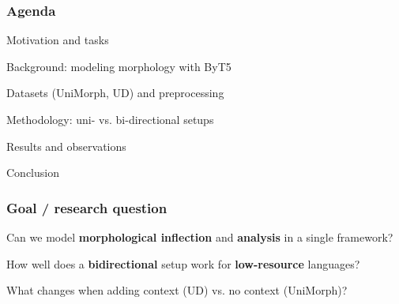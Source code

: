 
\begin{frame}
    \frametitle{Agenda}
    \begin{PraesentationAufzaehlung}
        \item Motivation and tasks
        \item Background: modeling morphology with ByT5
        \item Datasets (UniMorph, UD) and preprocessing
        \item Methodology: uni- vs. bi-directional setups
        \item Results and observations
        \item Conclusion
    \end{PraesentationAufzaehlung}
\end{frame}

\begin{frame}
    \frametitle{Goal / research question}
    \begin{PraesentationAufzaehlung}
        \item Can we model \textbf{morphological inflection} and \textbf{analysis} in a single framework?
        \item How well does a \textbf{bidirectional} setup work for \textbf{low-resource} languages?
        \item What changes when adding context (UD) vs. no context (UniMorph)?
    \end{PraesentationAufzaehlung}
\end{frame}

